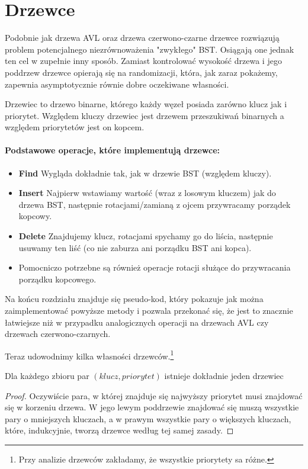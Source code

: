\section{Drzewce}

\label{sec:drzewce}

Podobnie jak drzewa AVL oraz drzewa czerwono-czarne drzewce rozwiązują problem potencjalnego niezrównoważenia "zwykłego" BST.
Osiągają one jednak ten cel w zupełnie inny sposób.
Zamiast kontrolować wysokość drzewa i jego poddrzew drzewce opierają się na randomizacji, która, jak zaraz pokażemy, zapewnia asymptotycznie równie dobre oczekiwane własności. 

\begin{definition} 
Drzewiec to drzewo binarne, którego każdy węzeł posiada zarówno klucz jak i priorytet.
Względem kluczy drzewiec jest drzewem przeszukiwań binarnych a względem priorytetów jest on kopcem.
\end{definition}

\paragraph{Podstawowe operacje, które implementują drzewce:}
\begin{itemize}
    \item \textbf{Find} Wygląda dokładnie tak, jak w drzewie BST (względem kluczy).
    \item \textbf{Insert} Najpierw wstawiamy wartość (wraz z losowym kluczem) jak do drzewa BST, następnie rotacjami/zamianą z ojcem przywracamy porządek kopcowy.
    \item \textbf{Delete} Znajdujemy klucz, rotacjami spychamy go do liścia, następnie usuwamy ten liść (co nie zaburza ani porządku BST ani kopca).
    \item Pomocniczo potrzebne są również operacje rotacji służące do przywracania porządku kopcowego.
\end{itemize}

Na końcu rozdziału znajduje się pseudo-kod, który pokazuje jak można zaimplementować powyższe metody i pozwala przekonać się, że jest to znacznie łatwiejsze niż w przypadku analogicznych operacji na drzewach AVL czy drzewach czerwono-czarnych.

Teraz udowodnimy kilka własności drzewców.\footnote{Przy analizie drzewców zakładamy, że wszystkie priorytety sa różne.}

\begin{theorem}
\label{unique treap}
 Dla każdego zbioru par $(klucz, priorytet)$ istnieje dokładnie jeden drzewiec
 \label{xyz}
\end{theorem}
\begin{proof}
Oczywiście para, w której znajduje się najwyższy priorytet musi znajdować się w korzeniu drzewa.
W jego lewym poddrzewie znajdować się muszą wszystkie pary o mniejszych kluczach, a w prawym wszystkie pary o większych kluczach, które, indukcyjnie, tworzą drzewce według tej samej zasady.
\end{proof}

